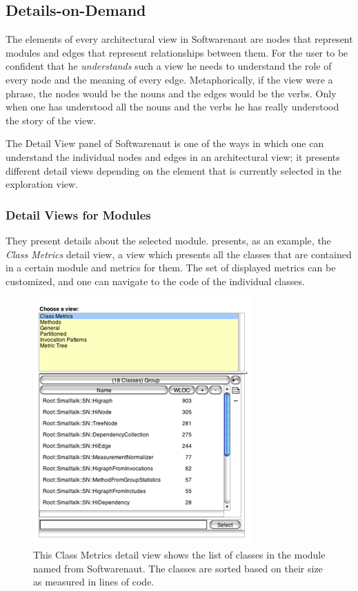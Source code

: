 \documentclass[preprint,12pt]{elsarticle}
\begin{document}
\newpage
\subsection {Details-on-Demand}


The elements of every architectural view in Softwarenaut are nodes that represent modules and edges that represent relationships between them. For the user to be confident that he {\em understands} such a view he needs to understand the role of every node and the meaning of every edge. Metaphorically, if the view were a phrase, the nodes would be the nouns and the edges would be the verbs. Only when one has understood all the nouns and the verbs he has really understood the story of the view.  

The Detail View panel of Softwarenaut is one of the ways in which one can understand the individual nodes and edges in an architectural view; it presents different detail views depending on the element that is currently selected in the exploration view. %



\subsubsection {Detail Views for Modules}
They present details about the selected module.  presents, as an example, the {\em Class Metrics} detail view, a view which presents all the classes that are contained in a certain module and metrics for them. The set of displayed metrics can be customized, and one can navigate to the code of the individual classes. 

\begin{figure}[h]
\begin{center}
\includegraphics[width=0.43\linewidth]{images/DetailForNode.png}
\caption{This Class Metrics detail view shows the list of classes in the module named  from Softwarenaut. The classes are sorted based on their size as measured in lines of code.}

\end{center}
\end{figure}
\end{document}
